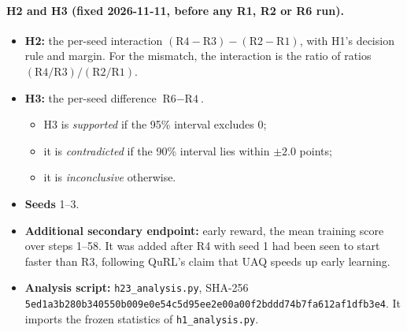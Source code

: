 \paragraph{H2 and H3 (fixed 2026-11-11, before any R1, R2 or R6 run).}
\begin{itemize}[leftmargin=*,itemsep=2pt]
\item \textbf{H2:} the per-seed interaction $(\text{R4}-\text{R3})-(\text{R2}-\text{R1})$, with H1's decision rule and margin. For the mismatch, the interaction is the ratio of ratios $(\text{R4}/\text{R3})/(\text{R2}/\text{R1})$.
\item \textbf{H3:} the per-seed difference $\text{R6}-\text{R4}$.
  \begin{itemize}[leftmargin=*,itemsep=1pt]
  \item H3 is \emph{supported} if the 95\% interval excludes 0;
  \item it is \emph{contradicted} if the 90\% interval lies within $\pm2.0$ points;
  \item it is \emph{inconclusive} otherwise.
  \end{itemize}
\item \textbf{Seeds} 1--3.
\item \textbf{Additional secondary endpoint:} early reward, the mean training score over steps 1--58. It was added after R4 with seed 1 had been seen to start faster than R3, following QuRL's claim that UAQ speeds up early learning.
\item \textbf{Analysis script:} \texttt{h23\_analysis.py}, SHA-256 \nolinkurl{5ed1a3b280b340550b009e0e54c5d95ee2e00a00f2bddd74b7fa612af1dfb3e4}. It imports the frozen statistics of \texttt{h1\_analysis.py}.
\end{itemize}

